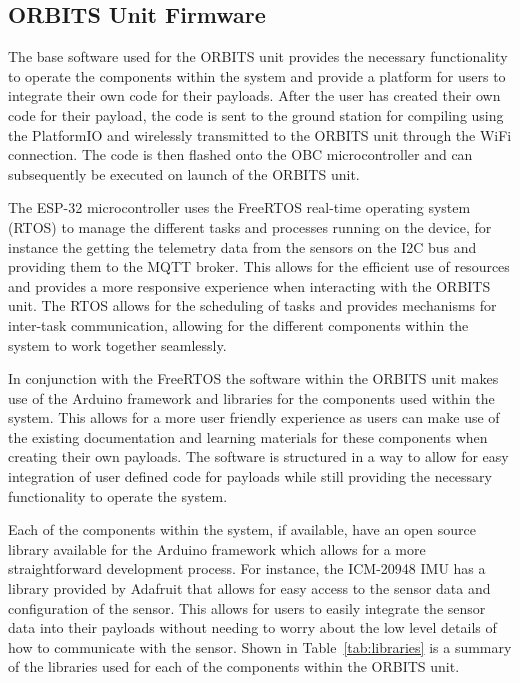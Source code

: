 \documentclass[a4paper,12pt,titlepage]{report}
\begin{document}
\subsection{ORBITS Unit Firmware}
The base software used for the ORBITS unit provides the necessary functionality to operate the components within the system and provide a platform for users to integrate their own code for their payloads. After the user has created their own code for their payload, the code is sent to the ground station for compiling using the PlatformIO and wirelessly transmitted to the ORBITS unit through the WiFi connection. The code is then flashed onto the OBC microcontroller and can subsequently be executed on launch of the ORBITS unit. 

The ESP-32 microcontroller uses the FreeRTOS real-time operating system (RTOS) to manage the different tasks and processes running on the device, for instance the getting the telemetry data from the sensors on the I2C bus and providing them to the MQTT broker. This allows for the efficient use of resources and provides a more responsive experience when interacting with the ORBITS unit. The RTOS allows for the scheduling of tasks and provides mechanisms for inter-task communication, allowing for the different components within the system to work together seamlessly.

In conjunction with the FreeRTOS the software within the ORBITS unit makes use of the Arduino framework and libraries for the components used within the system. This allows for a more user friendly experience as users can make use of the existing documentation and learning materials for these components when creating their own payloads. The software is structured in a way to allow for easy integration of user defined code for payloads while still providing the necessary functionality to operate the system.

Each of the components within the system, if available, have an open source library available for the Arduino framework which allows for a more straightforward development process. For instance, the ICM-20948 IMU has a library provided by Adafruit that allows for easy access to the sensor data and configuration of the sensor. This allows for users to easily integrate the sensor data into their payloads without needing to worry about the low level details of how to communicate with the sensor. Shown in Table~\ref{tab:libraries} is a summary of the libraries used for each of the components within the ORBITS unit.
\end{document}
